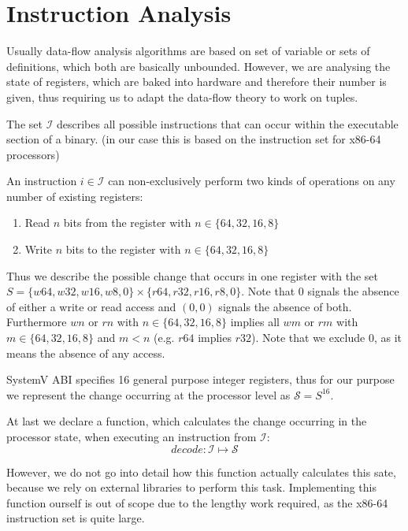 \section{Instruction Analysis}
\label{section:instructionanalysis}
Usually data-flow analysis algorithms are based on set of variable or sets of definitions, which both are basically unbounded. However, we are analysing the state of registers, which are baked into hardware and therefore their number is given, thus requiring us to adapt the data-flow theory to work on tuples.

The set $\mathcal{I}$ describes all possible instructions that can occur within the executable section of a binary. (in our case this is based on the instruction set for x86-64 processors)

An instruction $i \in \mathcal{I}$ can non-exclusively perform two kinds of operations on any number of existing registers:

\begin{enumerate}
\item Read $n$ bits from the register with $n \in \{ 64, 32, 16, 8 \}$
\item Write $n$ bits to the register with $n \in \{ 64, 32, 16, 8 \}$
\end{enumerate}

Thus we describe the possible change that occurs in one register with the set $S = \{ w64, w32, w16, w8, 0 \} \times \{r64, r32, r16, r8, 0 \}$. Note that 0 signals the absence of either a write or read access and $(0, 0)$ signals the absence of both. Furthermore $wn$ or $rn$ with $n \in \{64,32,16,8\}$ implies all $wm$ or $rm$ with $m \in \{64,32,16,8\}$ and $m < n$ (e.g. $r64$ implies $r32$). Note that we exclude 0, as it means the absence of any access.

SystemV ABI specifies 16 general purpose integer registers, thus for our purpose we represent the change occurring at the processor level as $\mathcal{S} = S^{16}$.

At last we declare a function, which calculates the change occurring in the processor state, when executing an instruction from $\mathcal{I}$:
\[
decode : \mathcal{I} \mapsto \mathcal{S}
\]

However, we do not go into detail how this function actually calculates this sate, because we rely on external libraries to perform this task. Implementing this function ourself is out of scope due to the lengthy work required, as the x86-64 instruction set is quite large.

